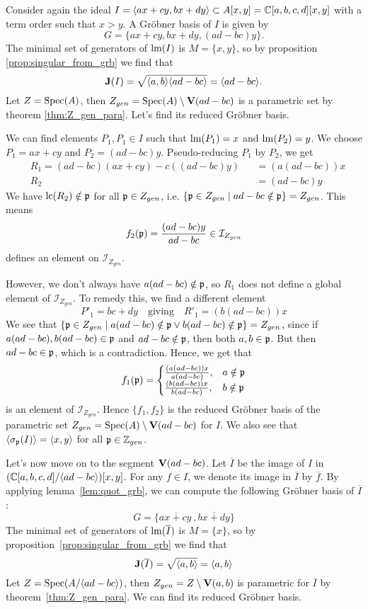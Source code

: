 \begin{example}\upshape
  Consider again the ideal $I = \langle ax + cy, bx + dy \rangle \subset A[x, y] = \mathbb{C}[a, b, c, d][x, y]$ with a term order such that $x > y$. A Gröbner basis of $I$ is given by
  \[G = \{ax + cy, bx + dy, (ad - bc)y\}.\]
  The minimal set of generators of $\operatorname{lm}(I)$ is $M = \{x, y\}$, so by proposition \ref{prop:singular_from_grb} we find that
  \[\operatorname{\mathbf J}(I) = \sqrt{\langle a, b \rangle \langle ad - bc \rangle} = \langle ad - bc \rangle.\]
  Let $Z = \operatorname{Spec}(A)$, then $Z_{gen} = \operatorname{Spec}(A) \setminus \operatorname{\mathbf V}(ad - bc)$ is a parametric set by theorem \ref{thm:Z_gen_para}. Let's find its reduced Gröbner basis.

  We can find elements $P_{1}, P_{1} \in I$ such that $\operatorname{lm}(P_{1}) = x$ and $\operatorname{lm}(P_{2}) = y$. We choose $P_{1} = ax + cy$ and $P_{2} = (ad - bc)y$. Pseudo-reducing $P_{1}$ by $P_{2}$, we get
  \begin{align*}
    &R_{1} = (ad - bc)(ax + cy) - c((ad - bc)y) &&= (a(ad - bc))x \\
    &R_{2} &&= (ad - bc)y
  \end{align*}
  We have $\operatorname{lc}(R_{2}) \notin \mathfrak p$ for all $\mathfrak p \in Z_{gen}$, i.e. $\{\mathfrak p \in Z_{gen} \mid ad - bc \notin \mathfrak p\} = Z_{gen}$. This means
  \[f_{2}(\mathfrak p) = \frac{(ad - bc)y}{ad - bc} \in \mathcal I_{Z_{gen}}\]
  defines an element on $\mathcal I_{Z_{gen}}$.

  However, we don't always have $a(ad - bc) \notin \mathfrak p$, so $R_{1}$ does not define a global element of $\mathcal I_{Z_{gen}}$. To remedy this, we find a different element
  \[P'_{1} = bc + dy \quad \text{giving} \quad R'_{1} = (b(ad - bc))x\]
  We see that $\{\mathfrak p \in Z_{gen} \mid a(ad - bc) \notin \mathfrak p \lor b(ad - bc) \notin \mathfrak p\} = Z_{gen}$, since if $a(ad - bc), b(ad - bc) \in \mathfrak p$ and $ad - bc \notin \mathfrak p$, then both $a, b \in \mathfrak p$. But then $ad - bc \in \mathfrak p$, which is a contradiction. Hence, we get that
  \[f_{1}(\mathfrak p) =
    \begin{cases}
      \frac{(a(ad - bc))x}{a(ad - bc)},  & a \notin \mathfrak p \\
      \frac{(b(ad - bc))x}{b(ad - bc)},  & b \notin \mathfrak p
    \end{cases}
  \]
  is an element of $\mathcal I_{Z_{gen}}$. Hence $\{f_{1}, f_{2}\}$ is the reduced Gröbner basis of the parametric set $Z_{gen} = \operatorname{Spec}(A) \setminus \operatorname{\mathbf V}(ad - bc)$ for $I$. We also see that $\langle \sigma_{\mathfrak p}(I) \rangle = \langle x, y \rangle$ for all $\mathfrak p \in \mathbb{Z}_{gen}$.

  Let's now move on to the segment $\operatorname{\mathbf V}(ad - bc)$. Let $\overline I$ be the image of $I$ in $(\mathbb{C}[a, b, c, d]/\langle ad - bc \rangle)[x, y]$. For any $f \in I$, we denote its image in $\overline I$ by $\overline f$. By applying lemma~\ref{lem:quot_grb}, we can compute the following Gröbner basis of $\overline I$:
  \[G = \{\overline{ax + cy^{~}}, \overline{bx + dy}\}\]
  The minimal set of generators of $\operatorname{lm}(\overline I)$ is $M = \{x\}$, so by proposition~\ref{prop:singular_from_grb} we find that
  \[\operatorname{\mathbf J}(\overline I) = \sqrt{\langle a, b \rangle} = \langle a, b \rangle\]
  Let $Z = \operatorname{Spec}(A/\langle ad - bc \rangle)$, then $Z_{gen} = Z \setminus \operatorname{\mathbf V}(a, b)$ is parametric for $\overline I$ by theorem~\ref{thm:Z_gen_para}. We can find its reduced Gröbner basis.


\end{example}
